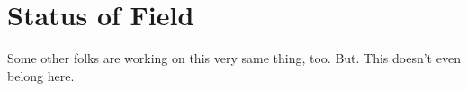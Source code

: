 \section{Status of Field}
\label{sec:field_status}
Some other folks are working on this very same thing, too.
But. This doesn't even belong here.



%
%
%
%
%
%
%
%
%
%
%
%


